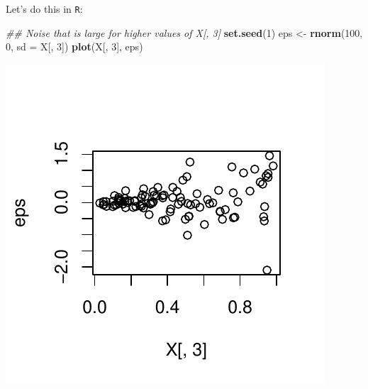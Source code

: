\documentclass[]{article}
\newenvironment{Shaded}{\begin{snugshade}}{\end{snugshade}}
\newcommand{\CommentTok}[1]{\textcolor[rgb]{0.56,0.35,0.01}{\textit{#1}}}
\newcommand{\DataTypeTok}[1]{\textcolor[rgb]{0.13,0.29,0.53}{#1}}
\newcommand{\DecValTok}[1]{\textcolor[rgb]{0.00,0.00,0.81}{#1}}
\newcommand{\KeywordTok}[1]{\textcolor[rgb]{0.13,0.29,0.53}{\textbf{#1}}}
\newcommand{\NormalTok}[1]{#1}
\newcommand{\OperatorTok}[1]{\textcolor[rgb]{0.81,0.36,0.00}{\textbf{#1}}}
\newcommand{\StringTok}[1]{\textcolor[rgb]{0.31,0.60,0.02}{#1}}
\begin{document}
Let's do this in \texttt{R}:

\begin{Shaded}
\begin{Highlighting}[]
\CommentTok{## Noise that is large for higher values of X[, 3]}
\KeywordTok{set.seed}\NormalTok{(}\DecValTok{1}\NormalTok{)}
\NormalTok{eps <-}\StringTok{ }\KeywordTok{rnorm}\NormalTok{(}\DecValTok{100}\NormalTok{, }\DecValTok{0}\NormalTok{, }\DataTypeTok{sd =}\NormalTok{ X[, }\DecValTok{3}\NormalTok{])}
\KeywordTok{plot}\NormalTok{(X[, }\DecValTok{3}\NormalTok{], eps)}
\end{Highlighting}
\end{Shaded}

\includegraphics{figs/robust-1.pdf}

\begin{Shaded}
\end{Shaded}
\end{document}
